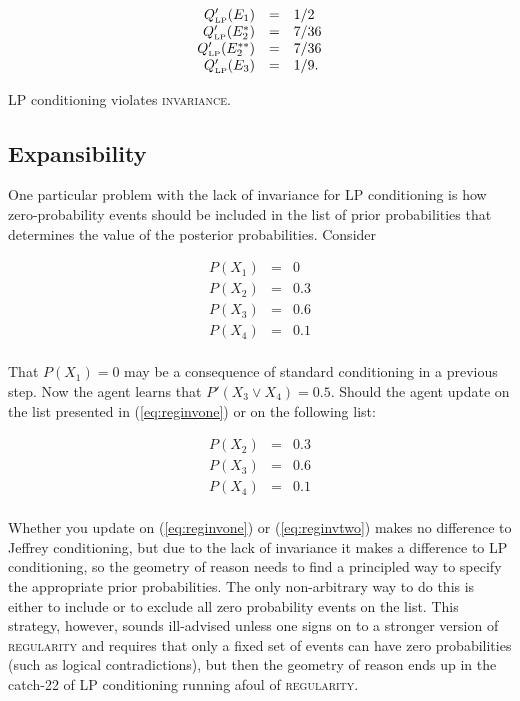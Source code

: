 \documentclass[11pt]{article}
\begin{document}
\begin{equation}
  \label{eq:marpleposteriorlp}
  \begin{array}{rcl}
  Q'_{\mbox{\tiny LP}}(E_{1})&=&1/2\\
  Q'_{\mbox{\tiny LP}}(E_{2}^{*})&=&7/36\\
  Q'_{\mbox{\tiny LP}}(E_{2}^{**})&=&7/36\\
  Q'_{\mbox{\tiny LP}}(E_{3})&=&1/9.
\end{array}
\end{equation}

LP conditioning violates \textsc{invariance}.

\subsection{Expansibility}
\label{Expansibility}

One particular problem with the lack of invariance for LP conditioning
is how zero-probability events should be included in the list of prior
probabilities that determines the value of the posterior
probabilities. Consider

\begin{equation}
  \label{eq:reginvone}
  \begin{array}{rcl}
  P(X_{1})&=&0\\
  P(X_{2})&=&0.3\\
  P(X_{3})&=&0.6\\
  P(X_{4})&=&0.1\\
\end{array}
\end{equation}

That $P(X_{1})=0$ may be a consequence of standard conditioning in a
previous step. Now the agent learns that $P'(X_{3}\vee{}X_{4})=0.5$.
Should the agent update on the list presented in (\ref{eq:reginvone})
or on the following list:

\begin{equation}
  \label{eq:reginvtwo}
  \begin{array}{rcl}
  P(X_{2})&=&0.3\\
  P(X_{3})&=&0.6\\
  P(X_{4})&=&0.1\\
\end{array}
\end{equation}

Whether you update on (\ref{eq:reginvone}) or (\ref{eq:reginvtwo})
makes no difference to Jeffrey conditioning, but due to the lack of
invariance it makes a difference to LP conditioning, so the geometry
of reason needs to find a principled way to specify the appropriate
prior probabilities. The only non-arbitrary way to do this is either
to include or to exclude all zero probability events on the list. This
strategy, however, sounds ill-advised unless one signs on to a
stronger version of \textsc{regularity} and requires that only a fixed
set of events can have zero probabilities (such as logical
contradictions), but then the geometry of reason ends up in the
catch-22 of LP conditioning running afoul of \textsc{regularity}.
\end{document}
